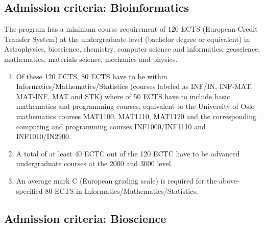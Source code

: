 \documentclass[%
oneside,                 %
final,                   %
10pt]{article}
\begin{document}
\noindent
\subsection*{Admission criteria: Bioinformatics}

The program has a minimum course requirement of 120 ECTS (European Credit Transfer System) at the undergraduate level (bachelor degree or equivalent) in Astrophysics, bioscience, chemistry, computer science and informatics, geoscience, mathematics, materials science, mechanics and physics. 
\begin{enumerate}
\item Of these 120 ECTS, 80 ECTS have to be within Informatics/Mathematics/Statistics (courses labeled as INF/IN, INF-MAT, MAT-INF, MAT and STK) where of 50 ECTS have to include basic mathematics and programming courses, equivalent to the University of Oslo mathematics courses MAT1100, MAT1110, MAT1120 and the corresponding computing and programming courses INF1000/INF1110 and INF1010/IN2900. 

\item A total of at least 40 ECTC out of the 120 ECTC have to be advanced undergraduate courses at the 2000 and 3000 level.

\item An average mark C (European grading scale) is required for the above-specified 80 ECTS in Informatics/Mathematics/Statistics.
\end{enumerate}

\noindent
\subsection*{Admission criteria: Bioscience}
\end{document}
